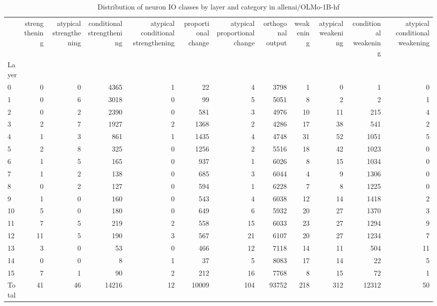 \begin{table}
\caption{Distribution of neuron IO classes by layer and category in allenai/OLMo-1B-hf}
\label{tab:allenai/OLMo-1B-hf}
\begin{tabular}{lrrrrrrrrrrr}
 & strengthening & atypical strengthening & conditional strengthening & atypical conditional strengthening & proportional change & atypical proportional change & orthogonal output & weakening & atypical weakening & conditional weakening & atypical conditional weakening \\
Layer &  &  &  &  &  &  &  &  &  &  &  \\
0 & 0 & 0 & 4365 & 1 & 22 & 4 & 3798 & 1 & 0 & 1 & 0 \\
1 & 0 & 6 & 3018 & 0 & 99 & 5 & 5051 & 8 & 2 & 2 & 1 \\
2 & 0 & 2 & 2390 & 0 & 581 & 3 & 4976 & 10 & 11 & 215 & 4 \\
3 & 2 & 7 & 1927 & 2 & 1368 & 2 & 4286 & 17 & 38 & 541 & 2 \\
4 & 1 & 3 & 861 & 1 & 1435 & 4 & 4748 & 31 & 52 & 1051 & 5 \\
5 & 2 & 8 & 325 & 0 & 1256 & 2 & 5516 & 18 & 42 & 1023 & 0 \\
6 & 1 & 5 & 165 & 0 & 937 & 1 & 6026 & 8 & 15 & 1034 & 0 \\
7 & 1 & 2 & 138 & 0 & 685 & 3 & 6044 & 4 & 9 & 1306 & 0 \\
8 & 0 & 2 & 127 & 0 & 594 & 1 & 6228 & 7 & 8 & 1225 & 0 \\
9 & 1 & 0 & 160 & 0 & 543 & 4 & 6038 & 12 & 14 & 1418 & 2 \\
10 & 5 & 0 & 180 & 0 & 649 & 6 & 5932 & 20 & 27 & 1370 & 3 \\
11 & 7 & 5 & 219 & 2 & 558 & 15 & 6033 & 23 & 27 & 1294 & 9 \\
12 & 11 & 5 & 190 & 3 & 567 & 21 & 6107 & 20 & 27 & 1234 & 7 \\
13 & 3 & 0 & 53 & 0 & 466 & 12 & 7118 & 14 & 11 & 504 & 11 \\
14 & 0 & 0 & 8 & 1 & 37 & 5 & 8083 & 17 & 14 & 22 & 5 \\
15 & 7 & 1 & 90 & 2 & 212 & 16 & 7768 & 8 & 15 & 72 & 1 \\
Total & 41 & 46 & 14216 & 12 & 10009 & 104 & 93752 & 218 & 312 & 12312 & 50 \\
\end{tabular}
\end{table}
